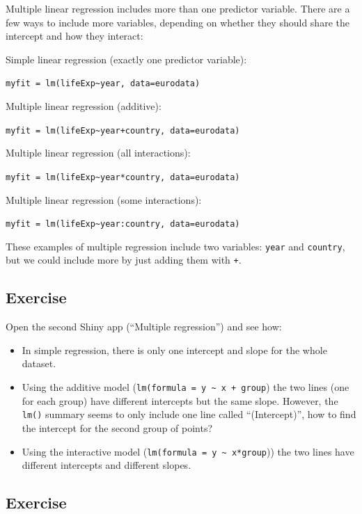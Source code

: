\documentclass[]{book}
\providecommand{\tightlist}{%
  \setlength{\itemsep}{0pt}\setlength{\parskip}{0pt}}
\theoremstyle{definition}
\theoremstyle{definition}
\theoremstyle{definition}
\theoremstyle{remark}
\begin{document}
Multiple linear regression includes more than one predictor variable.
There are a few ways to include more variables, depending on whether
they should share the intercept and how they interact:

Simple linear regression (exactly one predictor variable):

\texttt{myfit\ =\ lm(lifeExp\textasciitilde{}year,\ data=eurodata)}

Multiple linear regression (additive):

\texttt{myfit\ =\ lm(lifeExp\textasciitilde{}year+country,\ data=eurodata)}

Multiple linear regression (all interactions):

\texttt{myfit\ =\ lm(lifeExp\textasciitilde{}year*country,\ data=eurodata)}

Multiple linear regression (some interactions):

\texttt{myfit\ =\ lm(lifeExp\textasciitilde{}year:country,\ data=eurodata)}

These examples of multiple regression include two variables:
\texttt{year} and \texttt{country}, but we could include more by just
adding them with \texttt{+}.

\hypertarget{exercise-32}{%
\subsection{Exercise}\label{exercise-32}}

Open the second Shiny app (``Multiple regression'') and see how:

\begin{itemize}
\tightlist
\item
  In simple regression, there is only one intercept and slope for the
  whole dataset.
\item
  Using the additive model
  (\texttt{lm(formula\ =\ y\ \textasciitilde{}\ x\ +\ group}) the two
  lines (one for each group) have different intercepts but the same
  slope. However, the \texttt{lm()} summary seems to only include one
  line called ``(Intercept)'', how to find the intercept for the second
  group of points?
\item
  Using the interactive model
  (\texttt{lm(formula\ =\ y\ \textasciitilde{}\ x*group})) the two lines
  have different intercepts and different slopes.
\end{itemize}

\hypertarget{exercise-33}{%
\subsection{Exercise}\label{exercise-33}}
\end{document}
